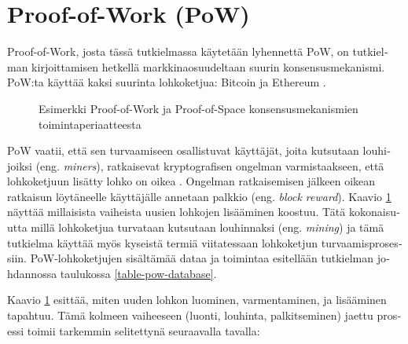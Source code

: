 \section{Proof-of-Work (PoW)\label{pow}}
\begin{otherlanguage}{english}
Proof-of-Work, josta tässä tutkielmassa käytetään lyhennettä PoW, on tutkielman kirjoittamisen hetkellä markkinaosuudeltaan suurin konsensusmekanismi. PoW:ta käyttää kaksi suurinta lohkoketjua: Bitcoin ja Ethereum \cite{Coingecko}.

\begin{figure}[!htbp]
\centering
{}
\caption{Esimerkki Proof-of-Work ja Proof-of-Space konsensusmekanismien toimintaperiaatteesta}
\label{fig_pow}
\end{figure}

\vspace{1mm}

PoW vaatii, että sen turvaamiseen osallistuvat käyttäjät, joita kutsutaan louhijoiksi (eng. \textit{miners}), ratkaisevat kryptografisen ongelman varmistaakseen, että lohkoketjuun lisätty lohko on oikea \cite{blockchain1}. Ongelman ratkaisemisen jälkeen oikean ratkaisun löytäneelle käyttäjälle annetaan palkkio (eng. \textit{block reward}). Kaavio \ref{fig_pow} näyttää millaisista vaiheista uusien lohkojen lisääminen koostuu. Tätä kokonaisuutta millä lohkoketjua turvataan kutsutaan louhinnaksi (eng. \textit{mining}) ja tämä tutkielma käyttää myös kyseistä termiä viitatessaan lohkoketjun turvaamisprosessiin. PoW-lohkoketjujen sisältämää dataa ja toimintaa esitellään tutkielman johdannossa taulukossa \ref{table-pow-database}.

Kaavio \ref{fig_pow} esittää, miten uuden lohkon luominen, varmentaminen, ja lisääminen tapahtuu. Tämä kolmeen vaiheeseen (luonti, louhinta, palkitseminen) jaettu prosessi toimii tarkemmin selitettynä seuraavalla tavalla:


\end{otherlanguage}
